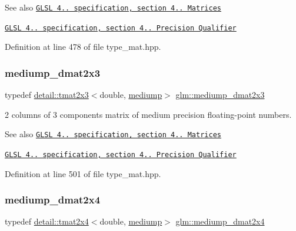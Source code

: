 \begin{DoxySeeAlso}{See also}
\href{http://www.opengl.org/registry/doc/GLSLangSpec.4.20.8.pdf}{\tt G\+L\+SL 4.. specification, section 4.. Matrices} 

\href{http://www.opengl.org/registry/doc/GLSLangSpec.4.20.8.pdf}{\tt G\+L\+SL 4.. specification, section 4.. Precision Qualifier} 
\end{DoxySeeAlso}


Definition at line 478 of file type\+\_\+mat.\+hpp.

\mbox{\label{group__core__precision_ga734e988edf759c7012c443014acb6674}} 
\subsubsection{\texorpdfstring{mediump\+\_\+dmat2x3}{mediump\_dmat2x3}}
{\footnotesize\ttfamily typedef \hyperlink{structglm_1_1detail_1_1tmat2x3}{detail\+::tmat2x3}$<$double, \hyperlink{namespaceglm_a0f04f086094c747d227af4425893f545a6416f3ea0c9025fb21ed50c4d6620482}{mediump}$>$ \hyperlink{group__core__precision_ga734e988edf759c7012c443014acb6674}{glm\+::mediump\+\_\+dmat2x3}}

2 columns of 3 components matrix of medium precision floating-\/point numbers.

\begin{DoxySeeAlso}{See also}
\href{http://www.opengl.org/registry/doc/GLSLangSpec.4.20.8.pdf}{\tt G\+L\+SL 4.. specification, section 4.. Matrices} 

\href{http://www.opengl.org/registry/doc/GLSLangSpec.4.20.8.pdf}{\tt G\+L\+SL 4.. specification, section 4.. Precision Qualifier} 
\end{DoxySeeAlso}


Definition at line 501 of file type\+\_\+mat.\+hpp.

\mbox{\label{group__core__precision_gadb60bf60ef2b8da4a28a372b2bcca3a3}} 
\subsubsection{\texorpdfstring{mediump\+\_\+dmat2x4}{mediump\_dmat2x4}}
{\footnotesize\ttfamily typedef \hyperlink{structglm_1_1detail_1_1tmat2x4}{detail\+::tmat2x4}$<$double, \hyperlink{namespaceglm_a0f04f086094c747d227af4425893f545a6416f3ea0c9025fb21ed50c4d6620482}{mediump}$>$ \hyperlink{group__core__precision_gadb60bf60ef2b8da4a28a372b2bcca3a3}{glm\+::mediump\+\_\+dmat2x4}}

